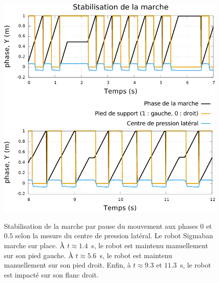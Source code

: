 \begin{figure}[htb!]
    \begin{center}
        \includegraphics[type=pdf,ext=.pdf,read=.pdf,width=0.9\linewidth]{../plot/walk_stabilization1}
        \includegraphics[type=pdf,ext=.pdf,read=.pdf,width=0.9\linewidth]{../plot/walk_stabilization2}
        \caption{\label{fig:walk_stabilization} Stabilisation de la marche par
            pause du mouvement aux phases $0$ et $0.5$ selon la mesure du centre de pression
            latéral. Le robot Sigmaban marche sur place. 
            À $t \approx 1.4$~s, le robot est maintenu manuellement sur son pied gauche.
            À $t \approx 5.6$~s, le robot est maintenu manuellement sur son pied droit.
            Enfin, à $t \approx 9.3$ et $11.3$~s, le robot est impacté sur son flanc droit.
        }
    \end{center}
\end{figure}

